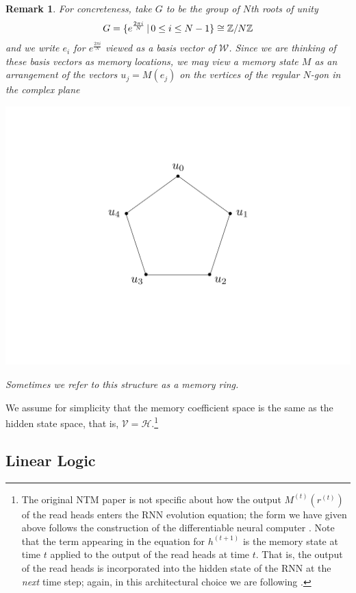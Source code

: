 \documentclass[english,letter paper,12pt,leqno]{article}
\theoremstyle{example}
\newtheorem{remark}[theorem]{Remark}
\numberwithin{equation}{section}
\begin{document}
\begin{remark} For concreteness, take $G$ to be the group of $N$th roots of unity
\[
G = \{ e^{\frac{2\pi i}{N}} \,|\, 0 \le i \le N - 1 \} \cong \mathbb{Z}/N \mathbb{Z}
\]
and we write $e_i$ for $e^{\frac{2\pi i}{N}}$ viewed as a basis vector of $\mathscr{W}$. Since we are thinking of these basis vectors as memory locations, we may view a memory state $M$ as an arrangement of the vectors $u_j = M(e_j)$ on the vertices of the regular $N$-gon in the complex plane
\begin{center}
\includegraphics[scale=0.3]{dia1}
\end{center}
Sometimes we refer to this structure as a \emph{memory ring}. 
\end{remark}

 We assume for simplicity that the memory coefficient space is the same as the hidden state space, that is, $\mathscr{V} = \mathscr{H}$.\footnote{The original NTM paper \cite{ntm} is not specific about how the output $M^{(t)}(r^{(t)})$ of the read heads enters the RNN evolution equation; the form we have given above follows the construction of the differentiable neural computer \cite[p. 7]{dnc}. Note that the term appearing in the equation for $h^{(t+1)}$ is the memory state at time $t$ applied to the output of the read heads at time $t$. That is, the output of the read heads is incorporated into the hidden state of the RNN at the \emph{next} time step; again, in this architectural choice we are following \cite{dnc}.}

\subsection{Linear Logic}
\end{document}
